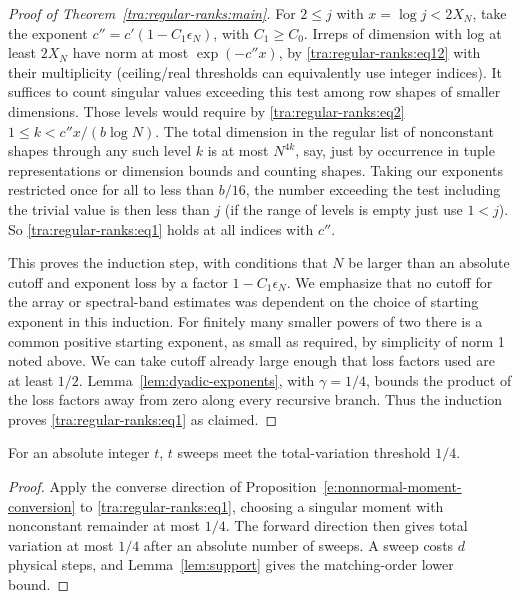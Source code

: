 \begin{proof}[Proof of Theorem~\ref{tra:regular-ranks:main}]
For \(2\le j\) with \(x=\log j<2X_N\), take the exponent
\(c''=c'(1-C_1\epsilon_N)\), with \(C_1\ge C_0\). Irreps of dimension with log at least \(2X_N\) have norm at most \(\exp(-c'' x)\), by \eqref{tra:regular-ranks:eq12} with their multiplicity (ceiling/real thresholds can equivalently use integer indices). It suffices to count singular values exceeding this test among row shapes of smaller dimensions. Those levels would require by \eqref{tra:regular-ranks:eq2}
\(1\le k < c'' x/(b\log N)\).
The total dimension in the regular list of nonconstant shapes through any such level \(k\) is at most \(N^{4k}\), say, just by occurrence in tuple representations or dimension bounds and counting shapes. Taking our exponents restricted once for all to less than \(b/16\), the number exceeding the test including the trivial value is then less than \(j\) (if the range of levels is empty just use \(1<j\)). So \eqref{tra:regular-ranks:eq1} holds at all indices with \(c''\).

This proves the induction step, with conditions that \(N\) be larger than an absolute cutoff and exponent loss by a factor \(1-C_1\epsilon_N\). We emphasize that no cutoff for the array or spectral-band estimates was dependent on the choice of starting exponent in this induction. For finitely many smaller powers of two there is a common positive starting exponent, as small as required, by simplicity of norm 1 noted above. We can take cutoff already large enough that loss factors used are at least \(1/2\). Lemma~\ref{lem:dyadic-exponents}, with $\gamma=1/4$, bounds the product of the loss factors away from zero along every recursive branch. Thus the induction proves \eqref{tra:regular-ranks:eq1} as claimed.
\end{proof}
\begin{corollary}\label{tra:regular-ranks:mixing}
For an absolute integer $t$, $t$ sweeps meet the total-variation threshold $1/4$.
\end{corollary}
\begin{proof}\label{tra:regular-ranks:mixing-proof}
\label{tra:regular-ranks:fourier-completion}
Apply the converse direction of
Proposition~\ref{e:nonnormal-moment-conversion} to
\eqref{tra:regular-ranks:eq1}, choosing a singular moment with
nonconstant remainder at most $1/4$. The forward direction then
gives total variation at most $1/4$ after an absolute number of
sweeps. A sweep costs $d$ physical steps, and
Lemma~\ref{lem:support} gives the matching-order lower bound.

\end{proof}
